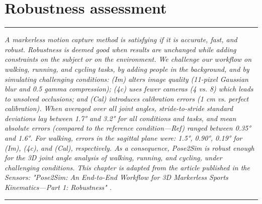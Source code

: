 
\lhead[\fancyplain{}{\leftmark}]%
      {\fancyplain{}{}} %
\chead[\fancyplain{}{}]%
      {\fancyplain{}{}}
\rhead[\fancyplain{}{}]%
      {\fancyplain{}{\rightmark}}%
\lfoot[\fancyplain{}{}]%
      {\fancyplain{}{}}
\cfoot[\fancyplain{}{\thepage}]%
      {\fancyplain{}{\thepage}} %
\rfoot[\fancyplain{}{}]%
     {\fancyplain{}{\scriptsize}}



\chapter{Robustness assessment}
\label{ch:4}


\begin{center}
\rule{0.7\linewidth}{.5pt}
\begin{minipage}{0.7\linewidth}
\smallskip

\textit{A markerless motion capture method is satisfying if it is accurate, fast, and robust. Robustness is deemed good when results are unchanged while adding constraints on the subject or on the environment. We challenge our workflow on walking, running, and cycling tasks, by adding people in the background, and by simulating challenging conditions: (Im) alters image quality (11-pixel Gaussian blur and 0.5 gamma compression); (4c) uses fewer cameras (4 vs. 8) which leads to unsolved occlusions; and (Cal) introduces calibration errors (1 cm vs. perfect calibration).\newline \newline
When averaged over all joint angles, stride-to-stride standard deviations lay between 1.7° and 3.2° for all conditions and tasks, and mean absolute errors (compared to the reference condition—Ref) ranged between 0.35° and 1.6°. For walking, errors in the sagittal plane were: 1.5°, 0.90°, 0.19° for (Im), (4c), and (Cal), respectively. As a consequence, Pose2Sim is robust enough for the 3D joint angle analysis of walking, running, and cycling, under challenging conditions. \newline\newline
This chapter is adapted from the article published in the Sensors: "Pose2Sim: An End-to-End Workflow for 3D Markerless Sports Kinematics—Part 1: Robustness" \cite{Pagnon2021}.
}


\end{minipage}
\smallskip
\rule{0.7\linewidth}{.5pt}
\end{center}



